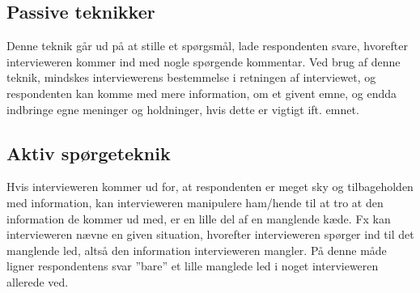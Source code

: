 \subsection{Passive teknikker}
Denne teknik går ud på at stille et spørgsmål, lade respondenten svare, hvorefter intervieweren kommer ind med nogle spørgende kommentar. Ved brug af denne teknik, mindskes interviewerens bestemmelse i retningen af interviewet, og respondenten kan komme med mere information, om et givent emne, og endda indbringe egne meninger og holdninger, hvis dette er vigtigt ift. emnet. \citep{metodeogprojektskrivning}\newline

\subsection{Aktiv spørgeteknik}
Hvis intervieweren kommer ud for, at respondenten er meget sky og tilbageholden med information, kan intervieweren manipulere ham/hende til at tro at den information de kommer ud med, er en lille del af en manglende kæde. Fx kan intervieweren nævne en given situation, hvorefter intervieweren spørger ind til det manglende led, altså den information intervieweren mangler. På denne måde ligner respondentens svar ”bare” et lille manglede led i noget intervieweren allerede ved. \citep{metodeogprojektskrivning}\newline
